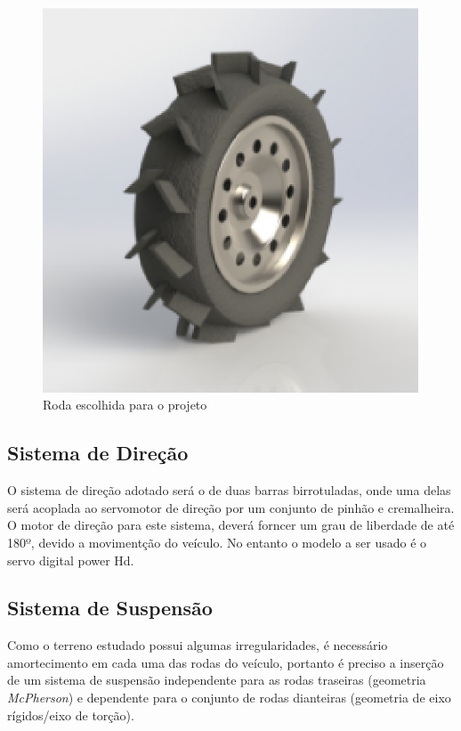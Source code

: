   \begin{figure}[!htbp]
  \begin{center}
  \includegraphics[keepaspectratio=true,scale=0.5]{figuras/wheel.eps}
  \caption{\label{WHEEL}Roda escolhida para o projeto}
  \end{center}
  \end{figure}

  \newpage
  \vfill
  \pagebreak

  \subsection{Sistema de Direção}
    O sistema de direção adotado será o de duas barras birrotuladas, onde uma delas será acoplada ao servomotor de direção por um conjunto de pinhão e cremalheira. O motor de direção para este sistema, deverá forncer um grau de liberdade de até 180º, devido a movimentção do veículo. No entanto o modelo a ser usado é o servo digital power Hd.

  \subsection{Sistema de Suspensão}
  Como o terreno estudado possui algumas irregularidades, é necessário amortecimento em cada uma das rodas do veículo, portanto é preciso a inserção de um sistema de suspensão independente para as rodas traseiras (geometria \textit{McPherson}) e dependente para o conjunto de rodas dianteiras (geometria de eixo rígidos/eixo de torção).

